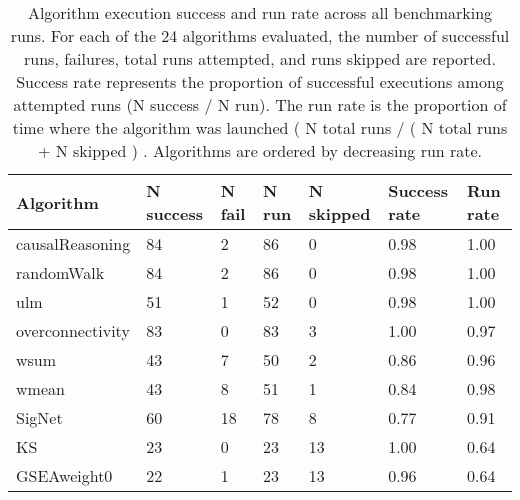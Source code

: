 \begin{table}[]
\caption[Algorithm execution success and run rate across all benchmarking runs.]{Algorithm execution success and run rate across all benchmarking runs. For each of the 24 algorithms evaluated, the number of successful runs, failures, total runs attempted, and runs skipped are reported. Success rate represents the proportion of successful executions among attempted runs (N success / N run). The run rate is the proportion of time where the algorithm was launched ( N total runs / ( N total runs + N skipped ) . Algorithms are ordered by decreasing run rate.}
\label{tab:table4.2}
\begin{tabular}{lllllll}
\hline
\textbf{Algorithm} & \textbf{N success} & \textbf{N fail} & \textbf{N run} & \textbf{N skipped} & \textbf{Success rate} & \textbf{Run rate} \\ \hline
causalReasoning    & 84                 & 2               & 86             & 0                  & 0.98                  & 1.00              \\
randomWalk         & 84                 & 2               & 86             & 0                  & 0.98                  & 1.00              \\
ulm                & 51                 & 1               & 52             & 0                  & 0.98                  & 1.00              \\
overconnectivity   & 83                 & 0               & 83             & 3                  & 1.00                  & 0.97              \\
wsum               & 43                 & 7               & 50             & 2                  & 0.86                  & 0.96              \\
wmean              & 43                 & 8               & 51             & 1                  & 0.84                  & 0.98              \\
SigNet             & 60                 & 18              & 78             & 8                  & 0.77                  & 0.91              \\
KS                 & 23                 & 0               & 23             & 13                 & 1.00                  & 0.64              \\
GSEAweight0        & 22                 & 1               & 23             & 13                 & 0.96                  & 0.64              \\

\end{tabular}
\end{table}
